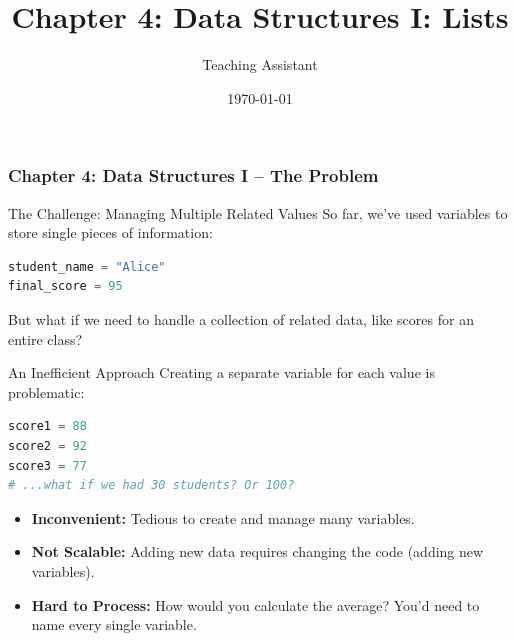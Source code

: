 \documentclass{beamer}
\title{Chapter 4: Data Structures I: Lists}
\author{Teaching Assistant}
\institute{University Name}
\date{\today}
\begin{document}
\frame{\titlepage}

\begin{frame}[fragile]
    \frametitle{Chapter 4: Data Structures I -- The Problem}

    \begin{block}{The Challenge: Managing Multiple Related Values}
        So far, we've used variables to store single pieces of information:
        \begin{lstlisting}[language=Python, basicstyle=\small\ttfamily]
student_name = "Alice"
final_score = 95
        \end{lstlisting}
        But what if we need to handle a collection of related data, like scores for an entire class?
    \end{block}
    
    \pause

    \begin{alertblock}{An Inefficient Approach}
        Creating a separate variable for each value is problematic:
        \begin{lstlisting}[language=Python, basicstyle=\small\ttfamily]
score1 = 88
score2 = 92
score3 = 77
# ...what if we had 30 students? Or 100?
        \end{lstlisting}
    \end{alertblock}

    \pause
    
    \begin{itemize}
        \item \textbf{Inconvenient:} Tedious to create and manage many variables.
        \item \textbf{Not Scalable:} Adding new data requires changing the code (adding new variables).
        \item \textbf{Hard to Process:} How would you calculate the average? You'd need to name every single variable.
    \end{itemize}

\end{frame}
\end{document}

